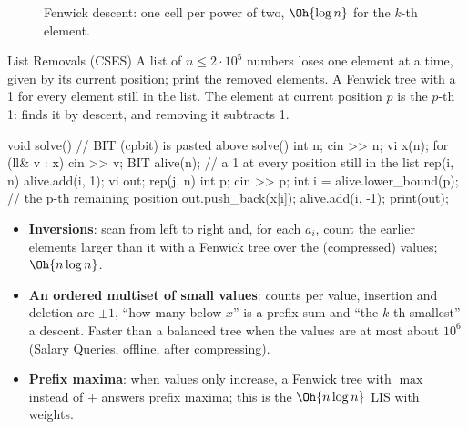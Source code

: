 \begin{figure}[htbp]
\centering
{}
\caption{Fenwick descent: one cell per power of two, $\Oh{\log n}$ for the $k$-th element.}
\label{fig:fendescent}
\end{figure}

\begin{problem}{List Removals (CSES)}
A list of $n \le 2 \cdot 10^5$ numbers loses one element at a time, given by its current position; print the removed elements.
\solution A Fenwick tree with a 1 for every element still in the list. The element at current position $p$ is the $p$-th 1:
 finds it by descent, and removing it subtracts 1.
\end{problem}

\begin{code}
void solve() {  // BIT (cpbit) is pasted above solve()
    int n;
    cin >> n;
    vi x(n);
    for (ll& v : x) cin >> v;
    BIT alive(n);  // a 1 at every position still in the list
    rep(i, n) alive.add(i, 1);
    vi out;
    rep(j, n) {
        int p;
        cin >> p;
        int i = alive.lower_bound(p);  // the p-th remaining position
        out.push_back(x[i]);
        alive.add(i, -1);
    }
    print(out);
}
\end{code}

\begin{trick}
\begin{itemize}
  \item \textbf{Inversions}: scan from left to right and, for each $a_i$, count the earlier elements larger than it with a Fenwick
        tree over the (compressed) values; $\Oh{n \log n}$.
  \item \textbf{An ordered multiset of small values}: counts per value, insertion and deletion are $\pm 1$, ``how many below
        $x$'' is a prefix sum and ``the $k$-th smallest'' a descent. Faster than a balanced tree when the values are at most
        about $10^6$ (Salary Queries, offline, after compressing).
  \item \textbf{Prefix maxima}: when values only increase, a Fenwick tree with $\max$ instead of $+$ answers prefix maxima; this
        is the $\Oh{n \log n}$ LIS with weights.
\end{itemize}
\end{trick}

